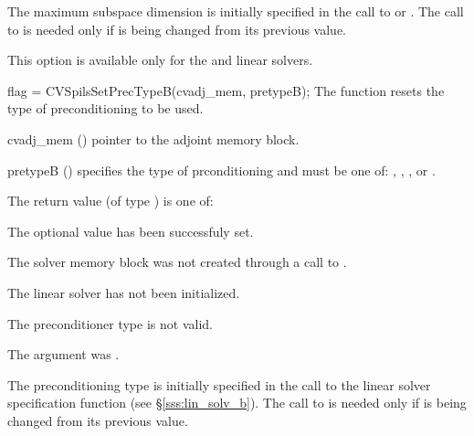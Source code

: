 {
  The maximum subspace dimension is initially specified in the call
  to  or .
  The call to  is needed only if  is being changed from its 
  previous value.

  {\warn}This option is available only for the {\cvspbcg} and {\cvsptfqmr} linear solvers.

}
{
  flag = CVSpilsSetPrecTypeB(cvadj\_mem, pretypeB);
}
{
  The function  resets the type
  of preconditioning to be used.
}
{
  \begin{args}
  \item[cvadj\_mem] ()
    pointer to the adjoint memory block.
  \item[pretypeB] ()
    specifies the type of prconditioning and must be one of:
    , , , or .
  \end{args}
}
{
  The return value  (of type ) is one of:
  \begin{args}
  \item[\Id{CVSPILS\_SUCCESS}] 
    The optional value has been successfuly set.
  \item[\Id{CVSPILS\_MEM\_NULL}]
    The {\cvodes} solver memory block was not created through a call to .
  \item[\Id{CVSPILS\_LMEM\_NULL}]
    The {\cvspgmr} linear solver has not been initialized.
  \item[\Id{CVSPILS\_ILL\_INPUT}]
    The preconditioner type  is not valid.
  \item[\Id{CVSPILS\_ADJMEM\_NULL}]
    The  argument was .
  \end{args}
}
{
  The preconditioning type is initially specified in the call
  to the linear solver specification function (see \S\ref{sss:lin_solv_b}). 
  The call to  is needed only if  is being changed from its 
  previous value.
}

